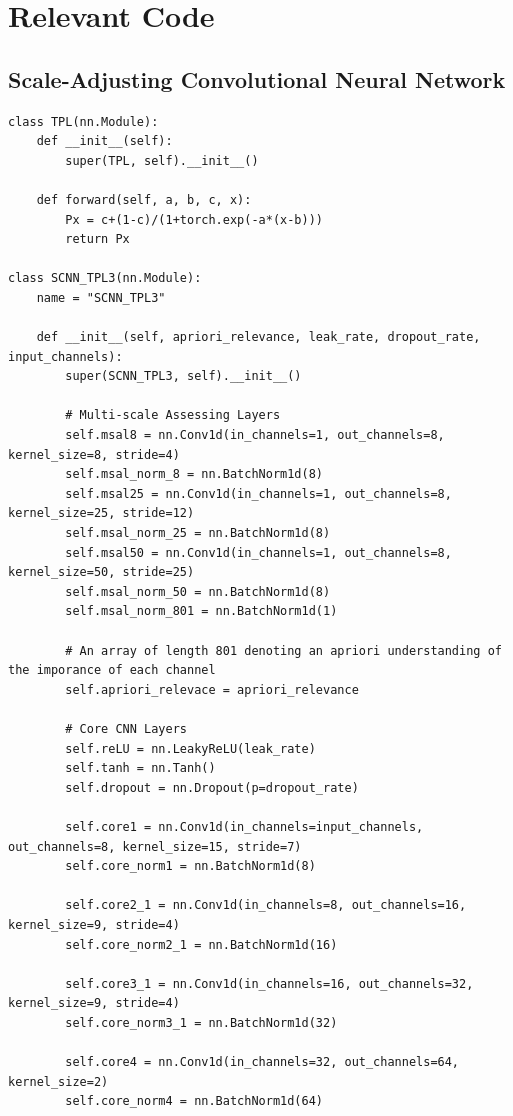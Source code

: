 \section{Relevant Code}
\subsection{Scale-Adjusting Convolutional Neural Network}
\begin{verbatim}
class TPL(nn.Module):
    def __init__(self):
        super(TPL, self).__init__()
    
    def forward(self, a, b, c, x):
        Px = c+(1-c)/(1+torch.exp(-a*(x-b)))
        return Px

class SCNN_TPL3(nn.Module):
    name = "SCNN_TPL3"

    def __init__(self, apriori_relevance, leak_rate, dropout_rate, input_channels):
        super(SCNN_TPL3, self).__init__()

        # Multi-scale Assessing Layers
        self.msal8 = nn.Conv1d(in_channels=1, out_channels=8, kernel_size=8, stride=4)
        self.msal_norm_8 = nn.BatchNorm1d(8)
        self.msal25 = nn.Conv1d(in_channels=1, out_channels=8, kernel_size=25, stride=12)
        self.msal_norm_25 = nn.BatchNorm1d(8)
        self.msal50 = nn.Conv1d(in_channels=1, out_channels=8, kernel_size=50, stride=25)
        self.msal_norm_50 = nn.BatchNorm1d(8)
        self.msal_norm_801 = nn.BatchNorm1d(1)

        # An array of length 801 denoting an apriori understanding of the imporance of each channel
        self.apriori_relevace = apriori_relevance

        # Core CNN Layers
        self.reLU = nn.LeakyReLU(leak_rate)
        self.tanh = nn.Tanh()
        self.dropout = nn.Dropout(p=dropout_rate)

        self.core1 = nn.Conv1d(in_channels=input_channels, out_channels=8, kernel_size=15, stride=7)
        self.core_norm1 = nn.BatchNorm1d(8)

        self.core2_1 = nn.Conv1d(in_channels=8, out_channels=16, kernel_size=9, stride=4)
        self.core_norm2_1 = nn.BatchNorm1d(16)

        self.core3_1 = nn.Conv1d(in_channels=16, out_channels=32, kernel_size=9, stride=4)
        self.core_norm3_1 = nn.BatchNorm1d(32)

        self.core4 = nn.Conv1d(in_channels=32, out_channels=64, kernel_size=2)
        self.core_norm4 = nn.BatchNorm1d(64)


\end{verbatim}
